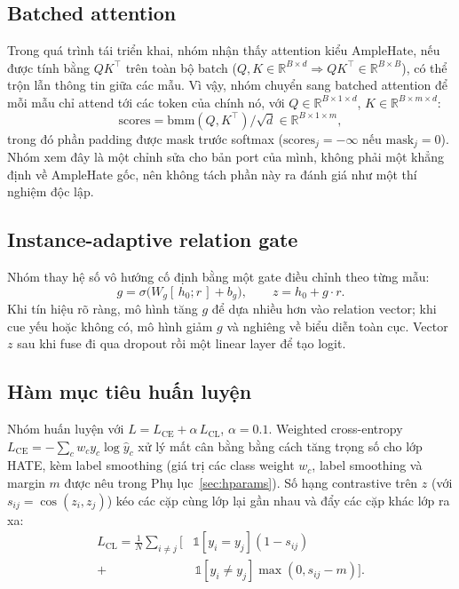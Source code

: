 \documentclass[11pt]{article}
\begin{document}
\subsection{Batched attention}
Trong quá trình tái triển khai, nhóm nhận thấy attention kiểu AmpleHate, nếu được tính bằng $QK^\top$ trên toàn bộ batch ($Q,K\in\mathbb{R}^{B\times d}\Rightarrow QK^\top\in\mathbb{R}^{B\times B}$), có thể trộn lẫn thông tin giữa các mẫu. Vì vậy, nhóm chuyển sang batched attention để mỗi mẫu chỉ attend tới các token của chính nó, với $Q\in\mathbb{R}^{B\times 1\times d}$, $K\in\mathbb{R}^{B\times m\times d}$:
\begin{equation}
  \mathrm{scores} = \mathrm{bmm}(Q,K^\top)/\sqrt d \in\mathbb{R}^{B\times1\times m},
\end{equation}
trong đó phần padding được mask trước softmax ($\mathrm{scores}_j=-\infty$ nếu $\mathrm{mask}_j=0$). Nhóm xem đây là một chỉnh sửa cho bản port của mình, không phải một khẳng định về AmpleHate gốc, nên không tách phần này ra đánh giá như một thí nghiệm độc lập.

\subsection{Instance-adaptive relation gate}
Nhóm thay hệ số vô hướng cố định bằng một gate điều chỉnh theo từng mẫu:
\begin{equation}
  g = \sigma\big(W_g[\,h_0;r\,] + b_g\big),\qquad z = h_0 + g\cdot r.
\end{equation}
Khi tín hiệu rõ ràng, mô hình tăng $g$ để dựa nhiều hơn vào relation vector; khi cue yếu hoặc không có, mô hình giảm $g$ và nghiêng về biểu diễn toàn cục. Vector $z$ sau khi fuse đi qua dropout rồi một linear layer để tạo logit.

\subsection{Hàm mục tiêu huấn luyện}
Nhóm huấn luyện với $L = L_{\mathrm{CE}} + \alpha\,L_{\mathrm{CL}}$, $\alpha=0.1$. Weighted cross-entropy $L_{\mathrm{CE}}=-\sum_c w_c y_c\log\hat y_c$ xử lý mất cân bằng bằng cách tăng trọng số cho lớp HATE, kèm label smoothing \citep{muller2019labelsmoothing} (giá trị các class weight $w_c$, label smoothing và margin $m$ được nêu trong Phụ lục~\ref{sec:hparams}). Số hạng contrastive trên $z$ (với $s_{ij}=\cos(z_i,z_j)$) kéo các cặp cùng lớp lại gần nhau và đẩy các cặp khác lớp ra xa:
\begin{equation}
\begin{split}
  L_{\mathrm{CL}} = \frac{1}{N}\sum_{i\neq j}\big[&\mathbb{1}[y_i{=}y_j](1-s_{ij}) \\[-2pt]
   + &\,\mathbb{1}[y_i{\neq}y_j]\max(0, s_{ij}-m)\big].
\end{split}
\end{equation}
\end{document}
